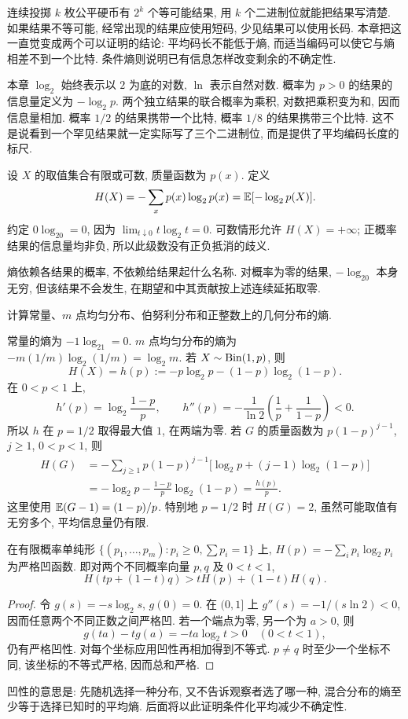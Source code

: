 
连续投掷 $k$ 枚公平硬币有 $2^k$ 个等可能结果, 用 $k$ 个二进制位就能把结果写清楚. 如果结果不等可能, 经常出现的结果应使用短码, 少见结果可以使用长码. 本章把这一直觉变成两个可以证明的结论: 平均码长不能低于熵, 而适当编码可以使它与熵相差不到一个比特. 条件熵则说明已有信息怎样改变剩余的不确定性.

本章 $\log_2$ 始终表示以 $2$ 为底的对数, $\ln$ 表示自然对数. 概率为 $p>0$ 的结果的信息量定义为 $-\log_2p$. 两个独立结果的联合概率为乘积, 对数把乘积变为和, 因而信息量相加. 概率 $1/2$ 的结果携带一个比特, 概率 $1/8$ 的结果携带三个比特. 这不是说看到一个罕见结果就一定实际写了三个二进制位, 而是提供了平均编码长度的标尺.

\begin{definition}[离散熵]
设 $X$ 的取值集合有限或可数, 质量函数为 $p(x)$. 定义
\[
 H(X)=-\sum_xp(x)\log_2p(x)=\mathbb E[-\log_2p(X)].
\]
约定 $0\log_20=0$, 因为 $\lim_{t\downarrow0}t\log_2t=0$. 可数情形允许 $H(X)=+\infty$; 正概率结果的信息量均非负, 所以此级数没有正负抵消的歧义.
\end{definition}
熵依赖各结果的概率, 不依赖给结果起什么名称. 对概率为零的结果, $-\log_20$ 本身无穷, 但该结果不会发生, 在期望和中其贡献按上述连续延拓取零.

\begin{example}
计算常量、$m$ 点均匀分布、伯努利分布和正整数上的几何分布的熵.
\end{example}
\begin{solution}
常量的熵为 $-1\log_21=0$. $m$ 点均匀分布的熵为
$-m(1/m)\log_2(1/m)=\log_2m$. 若 $X\sim\operatorname{Bin}(1,p)$, 则
\[
 H(X)=h(p):=-p\log_2p-(1-p)\log_2(1-p).
\]
在 $0<p<1$ 上,
\[
 h'(p)=\log_2\frac{1-p}{p},\qquad
 h''(p)=-\frac1{\ln2}\left(\frac1p+\frac1{1-p}\right)<0.
\]
所以 $h$ 在 $p=1/2$ 取得最大值 $1$, 在两端为零.
若 $G$ 的质量函数为 $p(1-p)^{j-1}$, $j\geq1$, $0<p<1$, 则
\begin{align*}
 H(G)&=-\sum_{j\geq1}p(1-p)^{j-1}\bigl[\log_2p+(j-1)\log_2(1-p)\bigr]\\
 &=-\log_2p-\frac{1-p}{p}\log_2(1-p)=\frac{h(p)}p.
\end{align*}
这里使用 $\mathbb E(G-1)=(1-p)/p$. 特别地 $p=1/2$ 时 $H(G)=2$, 虽然可能取值有无穷多个, 平均信息量仍有限.
\end{solution}

\begin{proposition}[熵的凹性]
在有限概率单纯形 $\{(p_1,\ldots,p_m):p_i\geq0,\sum p_i=1\}$ 上,
$H(p)=-\sum_i p_i\log_2p_i$ 为严格凹函数. 即对两个不同概率向量 $p,q$ 及 $0<t<1$,
\[
 H(tp+(1-t)q)>tH(p)+(1-t)H(q).
\]
\end{proposition}
\begin{proof}
令 $g(s)=-s\log_2s$, $g(0)=0$. 在 $(0,1]$ 上 $g''(s)=-1/(s\ln2)<0$, 因而任意两个不同正数之间严格凹. 若一个端点为零, 另一个为 $a>0$, 则
\[
 g(ta)-tg(a)=-ta\log_2t>0\quad(0<t<1),
\]
仍有严格凹性. 对每个坐标应用凹性再相加得到不等式. $p\ne q$ 时至少一个坐标不同, 该坐标的不等式严格, 因而总和严格.
\end{proof}
凹性的意思是: 先随机选择一种分布, 又不告诉观察者选了哪一种, 混合分布的熵至少等于选择已知时的平均熵. 后面将以此证明条件化平均减少不确定性.

